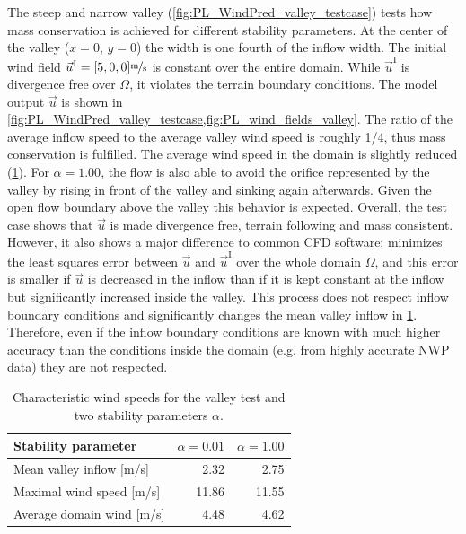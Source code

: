 \documentclass[twocolumn,letterpaper]{IEEEAerospaceCLS}
\begin{document}
The steep and narrow valley (\cref{fig:PL_WindPred_valley_testcase}) tests how mass conservation is achieved for different stability parameters. At the center of the valley ($x = 0$, $y = 0$) the width is one fourth of the inflow width. The initial wind field $\vec{u}^\text{I}=[5,0,0]\unitfrac[]{m}{s}$ is constant over the entire domain. While $\vec{u}^\text{I}$ is divergence free over $\Omega$, it violates the terrain boundary conditions. The model output $\vec{u}$ is shown in \cref{fig:PL_WindPred_valley_testcase,fig:PL_wind_fields_valley}. The ratio of the average inflow speed to the average valley wind speed is roughly 1/4, thus mass conservation is fulfilled. The average wind speed in the domain is slightly reduced (\cref{tab:PL_WindPred_wind_valley}). For $\alpha=1.00$, the flow is also able to avoid the orifice represented by the valley by rising in front of the valley and sinking again afterwards. Given the open flow boundary above the valley this behavior is expected. Overall, the test case shows that $\vec{u}$ is made divergence free, terrain following and mass consistent. However, it also shows a major difference to common \ac{CFD} software:  minimizes the least squares error between $\vec{u}$ and $\vec{u}^\text{I}$ over the whole domain $\Omega$, and this error is smaller if $\vec{u}$ is decreased in the inflow than if it is kept constant at the inflow but significantly increased inside the valley. This process does not respect inflow boundary conditions and significantly changes the mean valley inflow in \cref{tab:PL_WindPred_wind_valley}. Therefore, even if the inflow boundary conditions are known with much higher accuracy than the conditions inside the domain (e.g. from highly accurate NWP data) they are not respected.

\begin{table}[!h]
\caption{Characteristic wind speeds for the valley test and two stability parameters $\alpha$.}
\centering
\begin{tabular}{l r r}
\toprule
Stability parameter & $\alpha = 0.01$ & $\alpha = 1.00$ \\
\midrule
Mean valley inflow [m/s] & 2.32 & 2.75 \\
Maximal wind speed [m/s] & 11.86 & 11.55 \\
Average domain wind [m/s] & 4.48 & 4.62 \\
\bottomrule
\end{tabular}
\label{tab:PL_WindPred_wind_valley}
\end{table}
\end{document}
